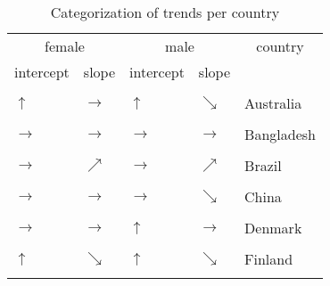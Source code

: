 \begin{table}[!h]

\caption{\label{tab:}Categorization of trends per country}
\centering
\begin{tabular}[t]{lllll}
\toprule
\multicolumn{2}{c}{female} & \multicolumn{2}{c}{male} & \multicolumn{1}{c}{country} \\
\cmidrule(l{3pt}r{3pt}){1-2} \cmidrule(l{3pt}r{3pt}){3-4} \cmidrule(l{3pt}r{3pt}){5-5}
intercept & slope & intercept & slope & \\
\midrule
\cellcolor{gray!6}{$\rightarrow$} & \cellcolor{gray!6}{$\nearrow$} & \cellcolor{gray!6}{$\uparrow$} & \cellcolor{gray!6}{$\rightarrow$} & \cellcolor{gray!6}{Argentina}\\
$\uparrow$ & $\rightarrow$ & $\uparrow$ & $\searrow$ & Australia\\
\cellcolor{gray!6}{$\rightarrow$} & \cellcolor{gray!6}{$\rightarrow$} & \cellcolor{gray!6}{$\uparrow$} & \cellcolor{gray!6}{$\rightarrow$} & \cellcolor{gray!6}{Austria}\\
$\rightarrow$ & $\rightarrow$ & $\rightarrow$ & $\rightarrow$ & Bangladesh\\
\cellcolor{gray!6}{$\rightarrow$} & \cellcolor{gray!6}{$\rightarrow$} & \cellcolor{gray!6}{$\uparrow$} & \cellcolor{gray!6}{$\rightarrow$} & \cellcolor{gray!6}{Belgium}\\
\addlinespace
$\rightarrow$ & $\nearrow$ & $\rightarrow$ & $\nearrow$ & Brazil\\
\cellcolor{gray!6}{$\uparrow$} & \cellcolor{gray!6}{$\rightarrow$} & \cellcolor{gray!6}{$\uparrow$} & \cellcolor{gray!6}{$\searrow$} & \cellcolor{gray!6}{Canada}\\
$\rightarrow$ & $\rightarrow$ & $\rightarrow$ & $\searrow$ & China\\
\cellcolor{gray!6}{$\uparrow$} & \cellcolor{gray!6}{$\rightarrow$} & \cellcolor{gray!6}{$\uparrow$} & \cellcolor{gray!6}{$\rightarrow$} & \cellcolor{gray!6}{Colombia}\\
$\rightarrow$ & $\rightarrow$ & $\uparrow$ & $\rightarrow$ & Denmark\\
\addlinespace
\cellcolor{gray!6}{$\rightarrow$} & \cellcolor{gray!6}{$\rightarrow$} & \cellcolor{gray!6}{$\uparrow$} & \cellcolor{gray!6}{$\rightarrow$} & \cellcolor{gray!6}{Egypt}\\
$\uparrow$ & $\searrow$ & $\uparrow$ & $\searrow$ & Finland\\
\cellcolor{gray!6}{$\rightarrow$} & \cellcolor{gray!6}{$\searrow$} & \cellcolor{gray!6}{$\uparrow$} & \cellcolor{gray!6}{$\rightarrow$} & \cellcolor{gray!6}{France}\\

\end{tabular}
\end{table}
